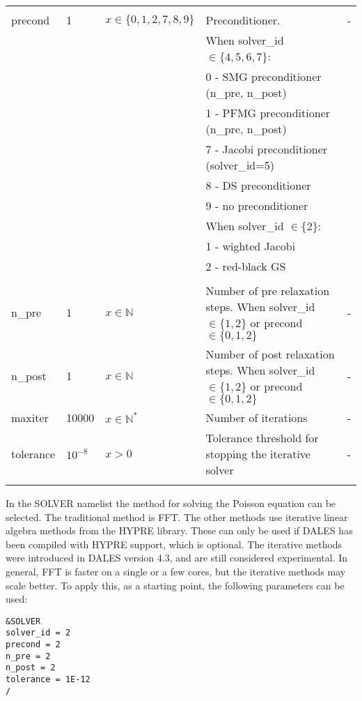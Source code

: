 \documentclass[twoside,11pt,fleqn,a4paper,english,openright]{report}
\begin{document}
\begin{center}
\begin{supertabular}{|l|p{2cm}|p{4cm}|p{6cm}|l|}
  	&&&&\\
  precond       &  1       &  $x \in \{0,1,2,7,8,9\}$  & Preconditioner.& -\\
  & & & When solver\_id $\in \{ 4,5,6,7 \}$: & \\ 
  & & & 0 - SMG preconditioner (n\_pre, n\_post) & \\
  & & & 1 - PFMG preconditioner (n\_pre, n\_post) & \\
  & & & 7 - Jacobi preconditioner  (solver\_id=5) & \\
  & & & 8 - DS preconditioner  & \\
  & & & 9 - no preconditioner & \\
  & & & When solver\_id $\in \{ 2 \}$: & \\ 
  & & & 1 - wighted Jacobi  & \\ %
  & & & 2 - red-black GS & \\  %
  &&&&\\
  n\_pre        & 1        &  $x \in \mathbb{N}$     & Number of pre relaxation steps. When solver\_id $\in \{1,2\}$ or precond $\in \{0,1,2 \}$ & -\\
  n\_post       & 1        &  $x \in \mathbb{N}$     & Number of post relaxation steps. When solver\_id $\in \{1,2\}$ or precond $\in \{0,1,2 \}$ & -\\
  maxiter       & 10000    &  $x \in \mathbb{N}^*$   & Number of iterations & -\\
  tolerance     & $10^{-8}$ &  $x > 0 $               & Tolerance threshold for stopping the iterative solver& -\\
  & & & &\\
 
\end{supertabular}
\end{center}
\noindent In the SOLVER namelist the method for solving the Poisson equation can be selected. The traditional method is FFT.
The other methods use iterative linear algebra methods from the HYPRE library. These can only be used if
DALES has been compiled with HYPRE support, which is optional. The iterative methods were introduced in DALES
version 4.3, and are still considered experimental. In general, FFT is faster on a single or a few cores,
but the iterative methods may scale better. To apply this, as a starting point, the following parameters can be used:
\begin{verbatim}
&SOLVER
solver_id = 2
precond = 2
n_pre = 2
n_post = 2
tolerance = 1E-12
/
\end{verbatim}
\end{document}
